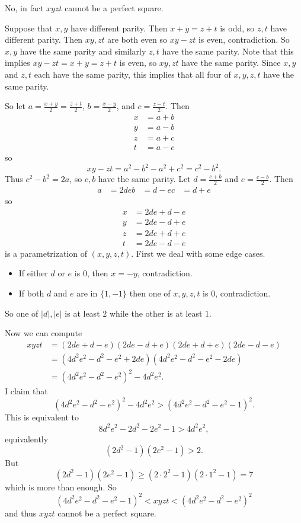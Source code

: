No, in fact $xyzt$ cannot be a perfect square.

Suppose that $x,y$ have different parity. Then $x+y=z+t$ is odd, so $z,t$ have different parity. Then $xy,zt$ are both even so $xy-zt$ is even, contradiction. So $x,y$ have the same parity and similarly $z,t$ have the same parity. Note that this implies $xy-zt=x+y=z+t$ is even, so $xy,zt$ have the same parity. Since $x,y$ and $z,t$ each have the same parity, this implies that all four of $x,y,z,t$ have the same parity.

So let $a=\frac{x+y}{2}=\frac{z+t}{2}$, $b=\frac{x-y}{2}$, and $c=\frac{z-t}{2}$. Then
\begin{align*}
	x&=a+b\\
	y&=a-b\\
	z&=a+c\\
	t&=a-c
\end{align*}
so \[xy-zt=a^2-b^2-a^2+c^2=c^2-b^2.\] Thus $c^2-b^2=2a$, so $c,b$ have the same parity. Let $d=\frac{c+b}{2}$ and $e=\frac{c-b}{2}$. Then
\begin{align*}
	a&=2de
	b&=d-e
	c&=d+e
\end{align*}
so
\begin{align*}
	x&=2de+d-e\\
	y&=2de-d+e\\
	z&=2de+d+e\\
	t&=2de-d-e
\end{align*}
is a parametrization of $(x,y,z,t)$. First we deal with some edge cases.
\begin{itemize}
	\item If either $d$ or $e$ is $0$, then $x=-y$, contradiction.
	\item If both $d$ and $e$ are in $\{1,-1\}$ then one of $x,y,z,t$ is $0$, contradiction.
\end{itemize}
So one of $|d|,|e|$ is at least $2$ while the other is at least $1$.

Now we can compute
\begin{align*}
	xyzt&=(2de+d-e)(2de-d+e)(2de+d+e)(2de-d-e)\\
	&=(4d^2e^2-d^2-e^2+2de)(4d^2e^2-d^2-e^2-2de)\\
	&=(4d^2e^2-d^2-e^2)^2-4d^2e^2.
\end{align*}
I claim that \[(4d^2e^2-d^2-e^2)^2-4d^2e^2>(4d^2e^2-d^2-e^2-1)^2.\] This is equivalent to \[8d^2e^2-2d^2-2e^2-1>4d^2e^2,\] equivalently \[(2d^2-1)(2e^2-1)>2.\] But \[(2d^2-1)(2e^2-1)\geq(2\cdot2^2-1)(2\cdot1^2-1)=7\] which is more than enough. So \[(4d^2e^2-d^2-e^2-1)^2<xyzt<(4d^2e^2-d^2-e^2)^2\] and thus $xyzt$ cannot be a perfect square.
